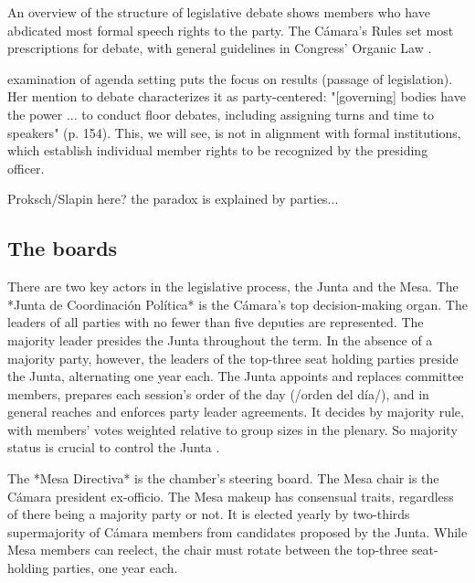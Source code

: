 \documentclass[letter,12pt]{article}
\begin{document}
An overview of the structure of legislative debate shows members who have abdicated most formal speech rights to the party. The Cámara's Rules \citep{reglamentoDipMx.2019} set most prescriptions for debate, with general guidelines in Congress' Organic Law \citep{loceum.2019}.

\citet{casar.agsetting.2016} examination of agenda setting puts the focus on results (passage of legislation). Her mention to debate characterizes it as party-centered: "[governing] bodies have the power ... to conduct floor debates, including assigning turns and time to speakers" (p. 154). This, we will see, is not in alignment with formal institutions, which establish individual member rights to be recognized by the presiding officer.

Proksch/Slapin here? the paradox is explained by parties... 



  \subsection{The boards}
There are two key actors in the legislative process, the Junta and the Mesa. The *Junta de Coordinación Política* is the Cámara's top decision-making organ. The leaders of all parties with no fewer than five deputies are represented. The majority leader presides the Junta throughout the term. In the absence of a majority party, however, the leaders of the top-three seat holding parties preside the Junta, alternating one year each. The Junta appoints and replaces committee members, prepares each session's order of the day (/orden del día/), and in general reaches and enforces party leader agreements. It decides by majority rule, with members' votes weighted relative to group sizes in the plenary. So majority status is crucial to control the Junta \citep[cf.][]{cox.mccubbins.2005}.



The *Mesa Directiva* is the chamber's steering board. The Mesa chair is the Cámara president ex-officio. The Mesa makeup has consensual traits, regardless of there being a majority party or not. It is elected yearly by two-thirds supermajority of Cámara members from candidates proposed by the Junta. While Mesa members can reelect, the chair must rotate between the top-three seat-holding parties, one year each. 
\end{document}
